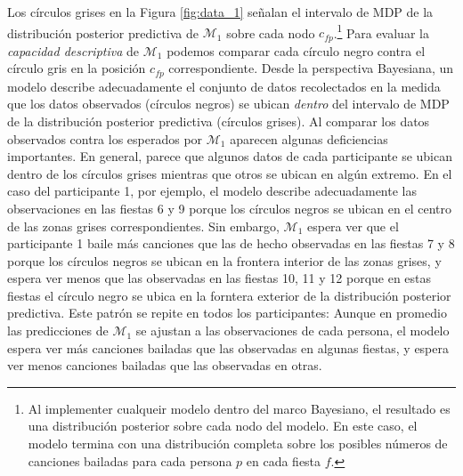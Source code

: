 \documentclass{article}
\begin{document}
\noindent Los círculos grises en la Figura \ref{fig:data_1} señalan el intervalo de MDP de la distribución posterior predictiva de $\mathcal M_1$ sobre cada nodo $c_{fp}$.\footnote{Al implementer cualqueir modelo dentro del marco Bayesiano, el resultado es una distribución posterior sobre cada nodo del modelo. En este caso, el modelo termina con una distribución completa sobre los posibles números de canciones bailadas para cada persona $p$ en cada fiesta $f$.} Para evaluar la \emph{capacidad descriptiva} de $\mathcal M_1$ podemos comparar cada círculo negro contra el círculo gris en la posición $c_{fp}$ correspondiente. Desde la perspectiva Bayesiana, un modelo describe adecuadamente el conjunto de datos recolectados en la medida que los datos observados (círculos negros) se ubican \emph{dentro} del intervalo de MDP de la distribución posterior predictiva (círculos grises). Al comparar los datos observados contra los esperados por $\mathcal M_1$ aparecen algunas deficiencias importantes. En general, parece que algunos datos de cada participante se ubican dentro de los círculos grises mientras que otros se ubican en algún extremo. En el caso del participante 1, por ejemplo, el modelo describe adecuadamente las observaciones en las fiestas 6 y 9 porque los círculos negros se ubican en el centro de las zonas grises correspondientes. Sin embargo, $\mathcal M_1$ espera ver que el participante  1 baile más canciones que las de hecho observadas en las fiestas 7 y 8 porque los círculos negros se ubican en la frontera interior de las zonas grises, y espera ver menos que las observadas en las fiestas 10, 11 y 12 porque en estas fiestas el círculo negro se ubica en la forntera exterior de la distribución posterior predictiva. Este patrón se repite en todos los participantes: Aunque en promedio las predicciones de $\mathcal M_1$ se ajustan a las observaciones de cada persona, el modelo espera ver más canciones bailadas que las observadas en algunas fiestas, y espera ver menos canciones bailadas que las observadas en otras.\\
\end{document}
